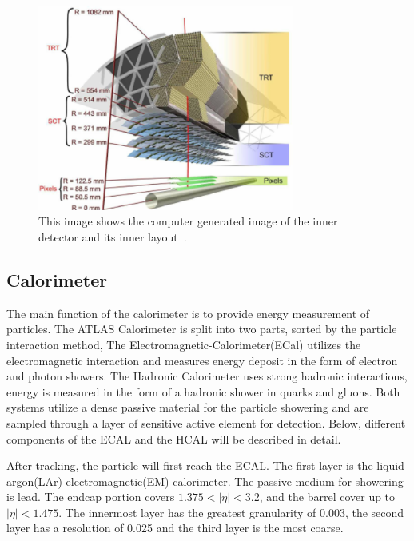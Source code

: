 \begin{figure}[!htb]
    \begin{center}
        \includegraphics[width=0.75\textwidth]{figures/chapter_ATLAS/InnerDetector2}
        \caption{
            This image shows the computer generated image of the inner detector and its inner layout~\cite{Pequenao:1095926}.
        }
        \label{fig:InnerDetector2}
    \end{center}
\end{figure}

\subsection{Calorimeter}
The main function of the calorimeter is to provide energy measurement of particles. The ATLAS Calorimeter is split into two parts, sorted by the particle interaction method, The Electromagnetic-Calorimeter(ECal) utilizes the electromagnetic interaction and measures energy deposit in the form of electron and photon showers. The Hadronic Calorimeter uses strong hadronic interactions, energy is measured in the form of a hadronic shower in quarks and gluons. Both systems utilize a dense passive material for the particle showering and are sampled through a layer of sensitive active element for detection. Below, different components of the ECAL and the HCAL will be described in detail. 

After tracking, the particle will first reach the ECAL. The first layer is the liquid-argon(LAr) electromagnetic(EM) calorimeter. The passive medium for showering is lead. The endcap portion covers $1.375< |\eta| < 3.2$, and the barrel cover up to $|\eta|<1.475$. The innermost layer has the greatest granularity of 0.003, the second layer has a resolution of 0.025 and the third layer is the most coarse. 

